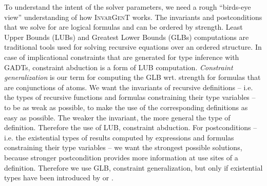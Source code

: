 \documentclass{article}
\newcommand{\tmem}[1]{{\em #1\/}}
\newcommand{\tmname}[1]{\textsc{#1}}
\newcommand{\tmverbatim}[1]{{\ttfamily{#1}}}
\begin{document}
To understand the intent of the solver parameters, we need a rough ``birds-eye
view'' understanding of how {\tmname{InvarGenT}} works. The invariants and
postconditions that we solve for are logical formulas and can be ordered by
strength. Least Upper Bounds (LUBs) and Greatest Lower Bounds (GLBs)
computations are traditional tools used for solving recursive equations over
an ordered structure. In case of implicational constraints that are generated
for type inference with GADTs, constraint abduction is a form of LUB
computation. {\tmem{Constraint generalization}} is our term for computing the
GLB wrt. strength for formulas that are conjunctions of atoms. We want the
invariants of recursive definitions -- i.e. the types of recursive functions
and formulas constraining their type variables -- to be as weak as possible,
to make the use of the corresponding definitions as easy as possible. The
weaker the invariant, the more general the type of definition. Therefore the
use of LUB, constraint abduction. For postconditions -- i.e. the existential
types of results computed by \tmverbatim{efunction} expressions and formulas
constraining their type variables -- we want the strongest possible solutions,
because stronger postcondition provides more information at use sites of a
definition. Therefore we use GLB, constraint generalization, but only if
existential types have been introduced by \tmverbatim{efunction} or
\tmverbatim{ematch}.
\end{document}
